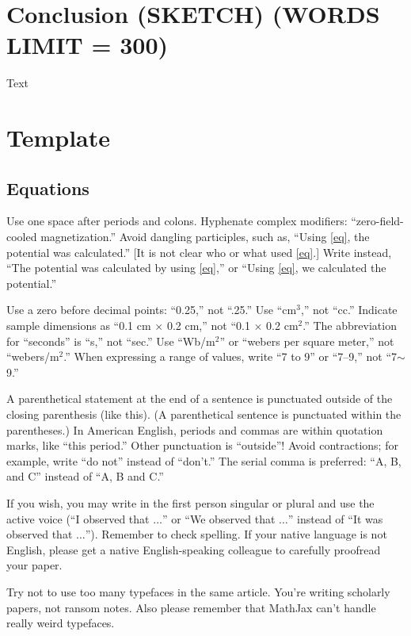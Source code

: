 \documentclass[journal,twoside,web]{ieeecolor2}
\begin{document}
\section{Conclusion (SKETCH) (WORDS LIMIT = 300)}
Text

\section{Template}

\subsection{Equations}
Use one space after periods and colons.
Hyphenate complex modifiers: 
``zero-field-cooled magnetization.'' Avoid dangling participles, such as, 
``Using \eqref{eq}, the potential was calculated.'' [It is not clear who or what 
used \eqref{eq}.] Write instead, ``The potential was calculated by using \eqref{eq},'' or 
``Using \eqref{eq}, we calculated the potential.''

Use a zero before decimal points: ``0.25,'' not ``.25.'' Use 
``cm$^{3}$,'' not ``cc.'' Indicate sample dimensions as ``0.1 cm 
$\times $ 0.2 cm,'' not ``0.1 $\times $ 0.2 cm$^{2}$.'' The 
abbreviation for ``seconds'' is ``s,'' not ``sec.'' Use 
``Wb/m$^{2}$'' or ``webers per square meter,'' not 
``webers/m$^{2}$.'' When expressing a range of values, write ``7 to 
9'' or ``7--9,'' not ``7$\sim $9.''

A parenthetical statement at the end of a sentence is punctuated outside of 
the closing parenthesis (like this).
(A parenthetical sentence is punctuated 
within the parentheses.) In American English, periods and commas are within 
quotation marks, like ``this period.'' Other punctuation is ``outside''! 
Avoid contractions; for example, write ``do not'' instead of ``don't.'' The 
serial comma is preferred: ``A, B, and C'' instead of ``A, B and C.''

If you wish, you may write in the first person singular or plural and use 
the active voice (``I observed that $\ldots$'' or ``We observed that $\ldots$'' 
instead of ``It was observed that $\ldots$'').
Remember to check spelling.
If 
your native language is not English, please get a native English-speaking 
colleague to carefully proofread your paper.

Try not to use too many typefaces in the same article.
You're writing
scholarly papers, not ransom notes.
Also please remember that MathJax
can't handle really weird typefaces.
\end{document}
